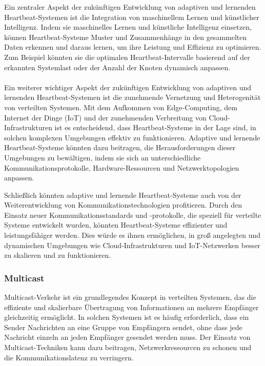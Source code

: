 Ein zentraler Aspekt der zukünftigen Entwicklung von adaptiven und lernenden Heartbeat-Systemen ist die Integration von maschinellem Lernen und künstlicher Intelligenz. Indem sie maschinelles Lernen und künstliche Intelligenz einsetzen, können Heartbeat-Systeme Muster und Zusammenhänge in den gesammelten Daten erkennen und daraus lernen, um ihre Leistung und Effizienz zu optimieren. Zum Beispiel könnten sie die optimalen Heartbeat-Intervalle basierend auf der erkannten Systemlast oder der Anzahl der Knoten dynamisch anpassen.
\\\\
Ein weiterer wichtiger Aspekt der zukünftigen Entwicklung von adaptiven und lernenden Heartbeat-Systemen ist die zunehmende Vernetzung und Heterogenität von verteilten Systemen. Mit dem Aufkommen von Edge-Computing, dem Internet der Dinge (IoT) und der zunehmenden Verbreitung von Cloud-Infrastrukturen ist es entscheidend, dass Heartbeat-Systeme in der Lage sind, in solchen komplexen Umgebungen effektiv zu funktionieren. Adaptive und lernende Heartbeat-Systeme könnten dazu beitragen, die Herausforderungen dieser Umgebungen zu bewältigen, indem sie sich an unterschiedliche Kommunikationsprotokolle, Hardware-Ressourcen und Netzwerktopologien anpassen.

Schließlich könnten adaptive und lernende Heartbeat-Systeme auch von der Weiterentwicklung von Kommunikationstechnologien profitieren. Durch den Einsatz neuer Kommunikationsstandards und -protokolle, die speziell für verteilte Systeme entwickelt wurden, könnten Heartbeat-Systeme effizienter und leistungsfähiger werden. Dies würde es ihnen ermöglichen, in groß angelegten und dynamischen Umgebungen wie Cloud-Infrastrukturen und IoT-Netzwerken besser zu skalieren und zu funktionieren.

\subsubsection{Multicast}

Multicast-Verkehr ist ein grundlegendes Konzept in verteilten Systemen, das die effiziente und skalierbare Übertragung von Informationen an mehrere Empfänger gleichzeitig ermöglicht. In solchen Systemen ist es häufig erforderlich, dass ein Sender Nachrichten an eine Gruppe von Empfängern sendet, ohne dass jede Nachricht einzeln an jeden Empfänger gesendet werden muss. Der Einsatz von Multicast-Techniken kann dazu beitragen, Netzwerkressourcen zu schonen und die Kommunikationslatenz zu verringern.

